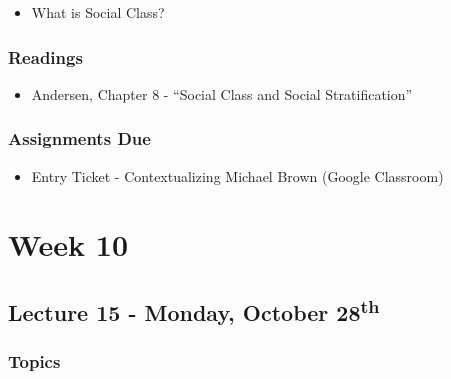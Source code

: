\documentclass[]{book}
\providecommand{\tightlist}{%
  \setlength{\itemsep}{0pt}\setlength{\parskip}{0pt}}
\begin{document}
\begin{itemize}
\tightlist
\item
  What is Social Class?
\end{itemize}

\hypertarget{readings-16}{%
\subsubsection*{Readings}\label{readings-16}}

\begin{itemize}
\tightlist
\item
  Andersen, Chapter 8 - ``Social Class and Social Stratification''
\end{itemize}

\hypertarget{assignments-due-3}{%
\subsubsection*{Assignments Due}\label{assignments-due-3}}

\begin{itemize}
\tightlist
\item
  Entry Ticket - Contextualizing Michael Brown (Google Classroom)
\end{itemize}

\newpage

\hypertarget{week-10}{%
\section*{Week 10}\label{week-10}}

\hypertarget{lecture-15---monday-october-28th}{%
\subsection*{\texorpdfstring{Lecture 15 - Monday, October 28\textsuperscript{th}}{Lecture 15 - Monday, October 28th}}\label{lecture-15---monday-october-28th}}

\hypertarget{topics-18}{%
\subsubsection*{Topics}\label{topics-18}}
\end{document}
